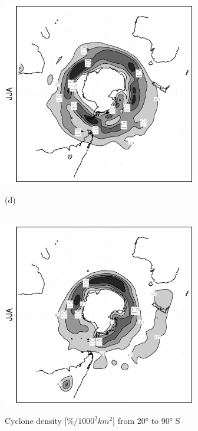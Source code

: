 \documentclass[12pt,a4paper,twoside,openright,headinclude,liststotoc,bibtotoc]{scrreprt}
\begin{document}
\begin{figure}[c]
{\includegraphics[height=8.0cm,angle=-90]
{eps/cycldensity_PLASIM_T21_45JJA_SH.eps}
}
\parbox{8.5cm}{\hspace{0.95cm}\begin{scriptsize}(d)\end{scriptsize} \vspace{-0.5cm} \\
\includegraphics[height=8.0cm,angle=-90]
{eps/cycldensity_ERA40_T21_45JJA_SH.eps}
}
\caption[Cyclone density Southern Hemisphere]{Cyclone density [$\%/1000^2 km^2$] from 20° to 90° S}
\label{img:SHcyclden}
\end{figure}
\end{document}
